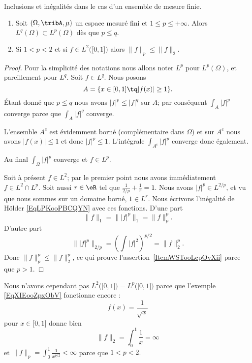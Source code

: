\begin{proposition} \label{PropIRDooFSWORl}
	Inclusions et inégalités dans le cas d'un ensemble de mesure finie.
	\begin{enumerate}
		\item
		      Soit \( (\Omega,\tribA,\mu)\) un espace mesuré fini et \( 1\leq p\leq +\infty\). Alors \( L^q(\Omega)\subset L^p(\Omega)\) dès que \( p\leq q\).
		\item   \label{ItemWSTooLcpOvXii}
		      Si \( 1<p<2\) et si \( f\in L^2\big( \mathopen[ 0 , 1 \mathclose] \big)\) alors \( \| f \|_p\leq \| f \|_2\).
	\end{enumerate}
\end{proposition}
\begin{proof}
	Pour la simplicité des notations nous allons noter \( L^p\) pour \( L^p(\Omega)\), et pareillement pour \( L^q\). Soit \( f\in L^q\). Nous posons
	\begin{equation}
		A=\{ x\in\mathopen[ 0 , 1 \mathclose]\tq | f(x) |\geq 1 \}.
	\end{equation}
	Étant donné que \( p\leq q\) nous avons \( | f |^p\leq | f |^q\) sur \( A\); par conséquent \( \int_A| f |^p\) converge parce que \( \int_A| f |^q\) converge.

	L'ensemble \( A^c\) est évidemment borné (complémentaire dans \(  \Omega \)) et sur \( A^c\) nous avons \( | f(x) |\leq 1\) et donc \( | f |^p\leq 1\). L'intégrale \( \int_{A^c}| f |^p\) converge donc également.

	Au final \( \int_{\Omega}| f |^p\) converge et \( f\in L^p\).


	Soit à présent \( f\in L^2\); par le premier point nous avons immédiatement \( f\in L^2\cap L^p\). Soit aussi \( r\in \eR\) tel que \( \frac{1}{ 2/p }+\frac{1}{ r }=1\). Nous avons \( | f |^p\in L^{2/p}\), et vu que nous sommes sur un domaine borné, \( 1\in L^r\). Nous écrivons l'inégalité de Hölder \eqref{EqLPKooPBCQYN} avec ces fonctions. D'une part
	\begin{equation}
		\| f \|_1=\| | f |^p \|_1=\| f \|_p^p.
	\end{equation}
	D'autre part
	\begin{equation}
		\| | f |^p \|_{2/p}=\left( \int| f |^2 \right)^{p/2}=\| f \|_2^p.
	\end{equation}
	Donc \( \| f \|_p^p\leq \| f \|_2^p\), ce qui prouve l'assertion~\ref{ItemWSTooLcpOvXii} parce que \( p>1\).
\end{proof}

\begin{remark}
	Nous n'avons cependant pas \( L^2\big( \mathopen[ 0 , 1 \mathclose] \big)=L^p\big( \mathopen[ 0 , 1 \mathclose] \big)\) parce que l'exemple \eqref{EqXIEooZpxObV} fonctionne encore :
	\begin{equation}
		f(x)=\frac{1}{ \sqrt{x} }
	\end{equation}
	pour \( x\in\mathopen[ 0 , 1 \mathclose]\) donne bien
	\begin{equation}
		\| f \|_2=\int_0^1\frac{1}{ x }=\infty
	\end{equation}
	et \( \| f \|_p=\int_0^1\frac{1}{ x^{p/2} }<\infty\) parce que \( 1<p<2\).
\end{remark}

